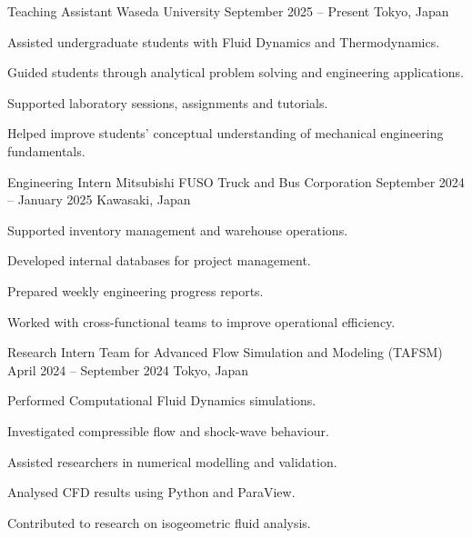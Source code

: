 
\ExperienceSection


\Experience
{Teaching Assistant}
{Waseda University}
{September 2025 -- Present}
{Tokyo, Japan}
{
\item Assisted undergraduate students with Fluid Dynamics and Thermodynamics.

\item Guided students through analytical problem solving and engineering
applications.

\item Supported laboratory sessions, assignments and tutorials.

\item Helped improve students' conceptual understanding of mechanical
engineering fundamentals.
}


\Experience
{Engineering Intern}
{Mitsubishi FUSO Truck and Bus Corporation}
{September 2024 -- January 2025}
{Kawasaki, Japan}
{
\item Supported inventory management and warehouse operations.

\item Developed internal databases for project management.

\item Prepared weekly engineering progress reports.

\item Worked with cross-functional teams to improve operational efficiency.
}


\Experience
{Research Intern}
{Team for Advanced Flow Simulation and Modeling (TAFSM)}
{April 2024 -- September 2024}
{Tokyo, Japan}
{
\item Performed Computational Fluid Dynamics simulations.

\item Investigated compressible flow and shock-wave behaviour.

\item Assisted researchers in numerical modelling and validation.

\item Analysed CFD results using Python and ParaView.

\item Contributed to research on isogeometric fluid analysis.
}

